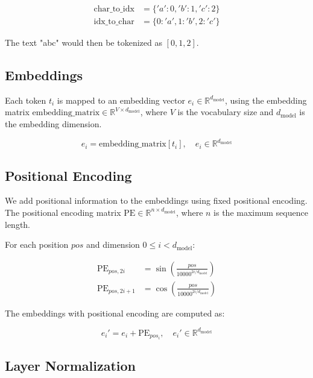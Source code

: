 \documentclass{article}
\begin{document}
\begin{align*}
    \text{char\_to\_idx} &= \{ 'a': 0, 'b': 1, 'c': 2 \} \\
    \text{idx\_to\_char} &= \{ 0: 'a', 1: 'b', 2: 'c' \}
\end{align*}

The text "abc" would then be tokenized as \([0, 1, 2]\).

\subsection{Embeddings}

Each token \( t_i \) is mapped to an embedding vector \( e_i \in \mathbb{R}^{d_{\text{model}}} \), using the embedding matrix \( \text{embedding\_matrix} \in \mathbb{R}^{V \times d_{\text{model}}} \), where \( V \) is the vocabulary size and \( d_{\text{model}} \) is the embedding dimension.

\begin{equation}
    e_i = \text{embedding\_matrix}[t_i], \quad e_i \in \mathbb{R}^{d_{\text{model}}}
\end{equation}

\subsection{Positional Encoding}

We add positional information to the embeddings using fixed positional encoding. The positional encoding matrix \( \text{PE} \in \mathbb{R}^{n \times d_{\text{model}}} \), where \( n \) is the maximum sequence length.

For each position \( pos \) and dimension \( 0 \leq i < d_{\text{model}} \):

\begin{align*}
    \text{PE}_{pos, 2i} &= \sin\left( \frac{pos}{10000^{2i / d_{\text{model}}}} \right) \\
    \text{PE}_{pos, 2i+1} &= \cos\left( \frac{pos}{10000^{2i / d_{\text{model}}}} \right)
\end{align*}

The embeddings with positional encoding are computed as:

\begin{equation}
    e_i' = e_i + \text{PE}_{pos_i}, \quad e_i' \in \mathbb{R}^{d_{\text{model}}}
\end{equation}

\subsection{Layer Normalization}
\end{document}
